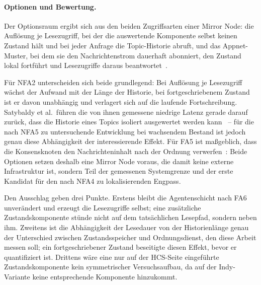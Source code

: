 \paragraph{Optionen und Bewertung.}
Der Optionsraum ergibt sich aus den beiden Zugriffsarten einer Mirror Node: die Auflösung je Lesezugriff, bei der die auswertende Komponente selbst keinen Zustand hält und bei jeder Anfrage die Topic-Historie abruft, und das Appnet-Muster, bei dem sie den Nachrichtenstrom dauerhaft abonniert, den Zustand lokal fortführt und Lesezugriffe daraus beantwortet~\cite{bairdgross2019}.

Für NFA2 unterscheiden sich beide grundlegend: Bei Auflösung je Lesezugriff wächst der Aufwand mit der Länge der Historie, bei fortgeschriebenem Zustand ist er davon unabhängig und verlagert sich auf die laufende Fortschreibung. Satybaldy et al.\ führen die von ihnen gemessene niedrige Latenz gerade darauf zurück, dass die Historie eines Topics isoliert ausgewertet werden kann~\cite{satybaldy2026} -- für die nach NFA5 zu untersuchende Entwicklung bei wachsendem Bestand ist jedoch genau diese Abhängigkeit der interessierende Effekt. Für FA5 ist maßgeblich, dass die Konsensknoten den Nachrichteninhalt nach der Ordnung verwerfen~\cite{bairdgross2019}: Beide Optionen setzen deshalb eine Mirror Node voraus, die damit keine externe Infrastruktur ist, sondern Teil der gemessenen Systemgrenze und der erste Kandidat für den nach NFA4 zu lokalisierenden Engpass.

Den Ausschlag geben drei Punkte. Erstens bleibt die Agentenschicht nach FA6 unverändert und erzeugt die Lesezugriffe selbst; eine zusätzliche Zustandskomponente stünde nicht auf dem tatsächlichen Lesepfad, sondern neben ihm. Zweitens ist die Abhängigkeit der Lesedauer von der Historienlänge genau der Unterschied zwischen Zustandsspeicher und Ordnungsdienst, den diese Arbeit messen soll; ein fortgeschriebener Zustand beseitigte diesen Effekt, bevor er quantifiziert ist. Drittens wäre eine nur auf der HCS-Seite eingeführte Zustandskomponente kein symmetrischer Versuchsaufbau, da auf der Indy-Variante keine entsprechende Komponente hinzukommt.

